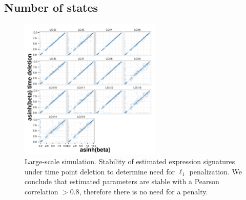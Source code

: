 \subsection{Number of states}
\label{sec:number-states-res}

\begin{figure}
  \centering
  \includegraphics[width=0.6\textwidth]{pics/no-pen-sim.pdf}
  \caption{Large-scale simulation. Stability of estimated expression signatures under time point deletion to determine need for $\ell_1$ penalization. We conclude that estimated parameters are stable with a Pearson correlation $>0.8$, therefore there is no need for a penalty.}
  \label{fig:lrg-sim-stab-l1}
\end{figure}

